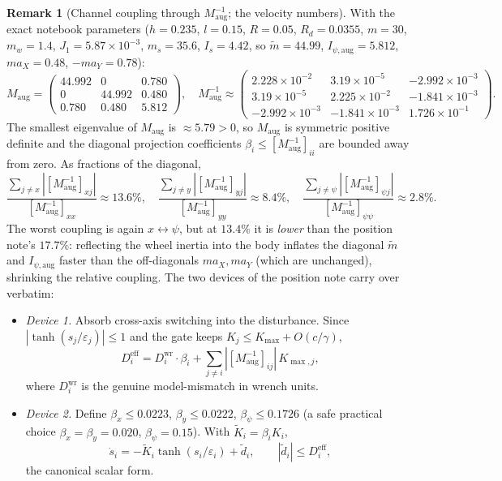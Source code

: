 \documentclass[11pt]{article}
\theoremstyle{plain}
\theoremstyle{definition}
\newtheorem{remark}{Remark}
\newcommand{\Maug}{M_{\mathrm{aug}}}
\newcommand{\Deff}{D^{\mathrm{eff}}}
\newcommand{\Dwr}{D^{\mathrm{wr}}}
\newcommand{\Kmax}{K_{\max}}
\newcommand{\Tr}[1]{\tanh\!\left(#1\right)}
\begin{document}
\begin{remark}[Channel coupling through $\Maug^{-1}$; the velocity numbers]
\label{rem:coupling}
With the exact notebook parameters ($h=0.235$, $l=0.15$, $R=0.05$, $R_d=0.0355$,
$m=30$, $m_w=1.4$, $J_1=5.87\times10^{-3}$, $m_s=35.6$, $I_s=4.42$, so
$\tilde m=44.99$, $I_{\psi,\mathrm{aug}}=5.812$, $m a_X=0.48$, $-m a_Y=0.78$):
\begin{equation}
\Maug=\begin{pmatrix}44.992&0&0.780\\0&44.992&0.480\\0.780&0.480&5.812\end{pmatrix},
\quad
\Maug^{-1}\!\approx\!\begin{pmatrix}
2.228\!\times\!10^{-2}&3.19\!\times\!10^{-5}&-2.992\!\times\!10^{-3}\\
3.19\!\times\!10^{-5}&2.225\!\times\!10^{-2}&-1.841\!\times\!10^{-3}\\
-2.992\!\times\!10^{-3}&-1.841\!\times\!10^{-3}&1.726\!\times\!10^{-1}
\end{pmatrix}.
\end{equation}
The smallest eigenvalue of $\Maug$ is $\approx5.79>0$, so $\Maug$ is symmetric
positive definite and the diagonal projection coefficients
$\beta_i\le[\Maug^{-1}]_{ii}$ are bounded away from zero. As fractions of the
diagonal,
\[
\frac{\sum_{j\neq x}|[\Maug^{-1}]_{xj}|}{[\Maug^{-1}]_{xx}}\approx13.6\%,\quad
\frac{\sum_{j\neq y}|[\Maug^{-1}]_{yj}|}{[\Maug^{-1}]_{yy}}\approx8.4\%,\quad
\frac{\sum_{j\neq\psi}|[\Maug^{-1}]_{\psi j}|}{[\Maug^{-1}]_{\psi\psi}}\approx2.8\%.
\]
The worst coupling is again $x\!\leftrightarrow\!\psi$, but at $13.4\%$ it is
\emph{lower} than the position note's $17.7\%$: reflecting the wheel inertia into the
body inflates the diagonal $\tilde m$ and $I_{\psi,\mathrm{aug}}$ faster than the
off-diagonals $m a_X,m a_Y$ (which are unchanged), shrinking the relative coupling.
The two devices of the position note carry over verbatim:
\begin{itemize}[leftmargin=1.5em]
\item \emph{Device 1.} Absorb cross-axis switching into the disturbance. Since
$|\Tr{s_j/\varepsilon_j}|\le1$ and the gate keeps $K_j\le\Kmax+O(c/\gamma)$,
\begin{equation}
\Deff_i=\Dwr_i\!\cdot\!\beta_i+\sum_{j\neq i}|[\Maug^{-1}]_{ij}|\,K_{\max,j},
\label{eq:Deff}
\end{equation}
where $\Dwr_i$ is the genuine model-mismatch in wrench units.
\item \emph{Device 2.} Define $\beta_x\le0.0223$, $\beta_y\le0.0222$,
$\beta_\psi\le0.1726$ (a safe practical choice $\beta_x=\beta_y=0.020$,
$\beta_\psi=0.15$). With $\tilde K_i=\beta_i K_i$,
\begin{equation}
\dot s_i=-\tilde K_i\Tr{s_i/\varepsilon_i}+\tilde d_i,\qquad
|\tilde d_i|\le\Deff_i,
\label{eq:canonical}
\end{equation}
the canonical scalar form.
\end{itemize}
\end{remark}
\end{document}
